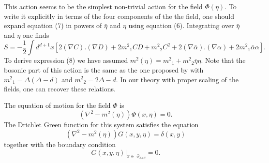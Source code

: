 \documentclass[a4paper,11pt]{article}
\begin{document}
This action seems to be the simplest non-trivial action for the
field $\Phi (\eta ).$ To write it explicitly in terms of the four
components of the the field, one should expand equation (7) in
powers of $\bar{\eta}$ and $\eta$ using equation (6). Integrating
over $\bar{\eta}$ and $\eta$ one finds
\begin{equation}  \label{Action_a}
S=-\frac{1}{2}\int d^{d+1} x [2(\nabla C).(\nabla D)+ 2{m^2}_1CD
+{m^2}_2 C^2 + 2(\nabla\bar{\alpha}).(\nabla\alpha)+2{m^2}_1
\bar{\alpha}\alpha].
\end{equation}
To derive expression (8) we have assumed $m^2(\eta)={m^2}_1
+{m^2}_2 \bar{\eta} \eta$. Note that the bosonic part of this
action is the same as the one proposed by
\cite{Khorrami,KoganAds} with ${m^2}_1=\Delta(\Delta-d)$ and ${
m^2}_2=2\Delta-d$. In our theory with proper scaling of the
fields, one can recover these relations.

The equation of motion for the field $\Phi$ is
\begin{equation}  \label{Eq.Motion}
({\nabla}^2 - m^2(\eta))\Phi(x,\eta)=0.
\end{equation}
The Drichlet Green function for this system satisfies the equation
\begin{equation}  \label{eqGreen}
({\nabla}^2 - m^2(\eta))G(x,y,\eta)=\delta(x,y)
\end{equation}
together with the boundary condition
\begin{equation}  \label{Boundary}
G(x,y,\eta)|_{x\in \:\partial_{AdS}} =0.
\end{equation}
\end{document}
